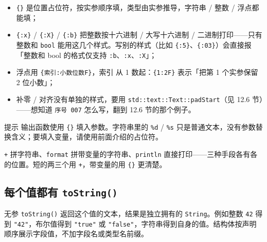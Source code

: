 \begin{itemize}

\item \texttt{\{\}} 是位置占位符，按实参顺序填，类型由实参推导，字符串 / 整数 / 浮点都能填；

\item \texttt{\{:\allowbreak{}x\}} / \texttt{\{:\allowbreak{}X\}} / \texttt{\{:\allowbreak{}b\}} 把整数按十六进制 / 大写十六进制 / 二进制打印——只有整数和 \texttt{bool} 能用这几个样式。写别的样式（比如 \texttt{\{:\allowbreak{}5\}}、\texttt{\{:\allowbreak{}03\}}）会直接报「整数和 bool 的格式仅支持 \texttt{:\allowbreak{}b}、\texttt{:\allowbreak{}x}、\texttt{:\allowbreak{}X}」；

\item 浮点用 \texttt{\{索引:\allowbreak{}小数位数F\}}，索引 从 1 数起：\texttt{\{1:\allowbreak{}2F\}} 表示「把第 1 个实参保留 2 位小数」；

\item 补零 / 对齐没有单独的样式，要用 \texttt{std:\allowbreak{}:\allowbreak{}text:\allowbreak{}:\allowbreak{}Text:\allowbreak{}:\allowbreak{}pad\allowbreak{}Start}（见 12.6 节）——想知道 \texttt{序号 007} 怎么写，翻到 12.6 节的那个例子。

\end{itemize}

\begin{tip}{提示}
输出函数使用 \texttt{\{\}} 填入参数。字符串里的 \texttt{\%d} / \texttt{\%s} 只是普通文本，没有参数替换含义；要填入变量，请使用前面介绍的占位符。
\end{tip}

\texttt{+} 拼字符串、\texttt{format} 拼带变量的字符串、\texttt{println} 直接打印——三种手段各有各的位置。短的两三个用 \texttt{+}，带变量的用 \texttt{\{\}} 更清楚。

\subsection{每个值都有 \texttt{to\allowbreak{}String(\allowbreak{})\allowbreak{}}}

无参 \texttt{to\allowbreak{}String(\allowbreak{})\allowbreak{}} 返回这个值的文本，结果是独立拥有的 \texttt{String}。例如整数 \texttt{42} 得到 \texttt{"42"}，布尔值得到 \texttt{"true"} 或 \texttt{"false"}，字符串得到自身的值。结构体按声明顺序展示字段值，不加字段名或类型名前缀。

